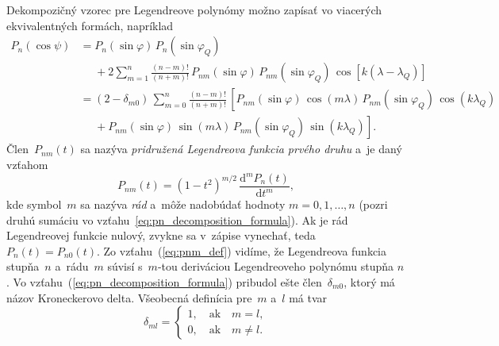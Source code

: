 \documentclass[a4paper,12pt]{book}
\newcommand{\diff}{\mathrm d}
\begin{document}
Dekompozičný vzorec pre Legendreove polynómy možno zapísať vo viacerých
ekvivalentných formách, napríklad
\parencite{Hobson,MoritzPhysicalGeodesy,SansoGeoidDetermination}
%
\begin{equation}
\label{eq:pn_decomposition_formula}
\begin{split}
P_n(\cos\psi) &= P_n(\sin\varphi) \, P_n(\sin\varphi_Q)\\
%
&\phantom{={}} +2 \sum_{m = 1}^{n} \frac{(n - m)!}{(n + m)!} \,
P_{nm}(\sin\varphi) \, P_{nm}(\sin\varphi_Q) \, \cos\left[k (\lambda
- \lambda_Q) \right]\\
%
&= (2 - \delta_{m0}) \, \sum_{m = 0}^{n} \frac{(n - m)!}{(n + m)!} \, \left[
P_{nm}(\sin\varphi) \, \cos(m\lambda) \, P_{nm}(\sin\varphi_Q) \,
\cos(k\lambda_Q)\right.\\
%
&\phantom{={}}+\left. P_{nm}(\sin\varphi) \, \sin(m\lambda) \,
P_{nm}(\sin\varphi_Q) \, \sin(k\lambda_Q)\right]{.}
\end{split}
\end{equation}
%
Člen~$P_{nm}(t)$ sa nazýva \emph{pridružená Legendreova funkcia prvého druhu}
a~je daný vzťahom
%
\begin{equation}
\label{eq:pnm_def}
P_{nm}(t) = (1 - t^2)^{m \slash 2} \, \frac{\diff^m P_n(t)}{\diff t^m}{,}
\end{equation}
%
kde symbol~$m$ sa nazýva \emph{rád} a~môže nadobúdať hodnoty $m = 0, 1, \dots, 
n$ (pozri druhú sumáciu vo vzťahu~\ref{eq:pn_decomposition_formula}).  Ak je 
rád Legendreovej funkcie nulový, zvykne sa v~zápise vynechať, teda $P_n(t) 
= P_{n0}(t)$.  Zo vzťahu~(\ref{eq:pnm_def}) vidíme, že Legendreova funkcia 
stupňa~$n$ a~rádu~$m$ súvisí s~$m$-tou deriváciou Legendreoveho polynómu stupňa 
$n$.  Vo vzťahu~(\ref{eq:pn_decomposition_formula}) pribudol ešte 
člen~$\delta_{m0}$, ktorý má názov Kroneckerovo delta.  Všeobecná definícia 
pre~$m$ a~$l$ má tvar
%
\begin{equation}
\delta_{ml} =
%
\begin{cases}
1{,} \quad \mathrm{ak} \quad m = l{,}\\
0{,} \quad \mathrm{ak} \quad m \neq l{.}
\end{cases}
\end{equation}
\end{document}
